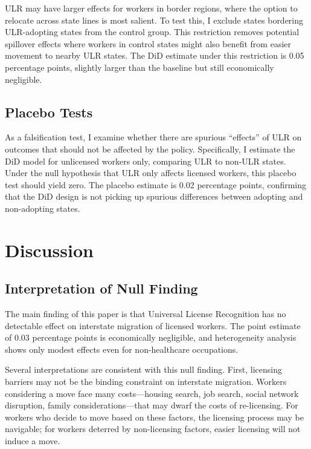 \documentclass[12pt]{article}
\begin{document}
ULR may have larger effects for workers in border regions, where the option to relocate across state lines is most salient. To test this, I exclude states bordering ULR-adopting states from the control group. This restriction removes potential spillover effects where workers in control states might also benefit from easier movement to nearby ULR states. The DiD estimate under this restriction is 0.05 percentage points, slightly larger than the baseline but still economically negligible.

\subsection{Placebo Tests}

As a falsification test, I examine whether there are spurious ``effects'' of ULR on outcomes that should not be affected by the policy. Specifically, I estimate the DiD model for unlicensed workers only, comparing ULR to non-ULR states. Under the null hypothesis that ULR only affects licensed workers, this placebo test should yield zero. The placebo estimate is 0.02 percentage points, confirming that the DiD design is not picking up spurious differences between adopting and non-adopting states.

\section{Discussion}

\subsection{Interpretation of Null Finding}

The main finding of this paper is that Universal License Recognition has no detectable effect on interstate migration of licensed workers. The point estimate of 0.03 percentage points is economically negligible, and heterogeneity analysis shows only modest effects even for non-healthcare occupations.

Several interpretations are consistent with this null finding. First, licensing barriers may not be the binding constraint on interstate migration. Workers considering a move face many costs---housing search, job search, social network disruption, family considerations---that may dwarf the costs of re-licensing. For workers who decide to move based on these factors, the licensing process may be navigable; for workers deterred by non-licensing factors, easier licensing will not induce a move.
\end{document}
